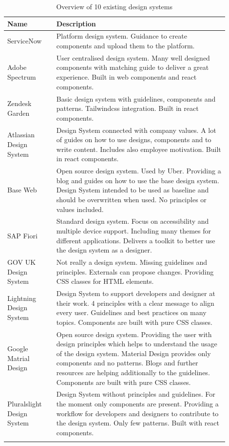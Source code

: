 \begin{longtable}{|p{0.2\linewidth} | p{0.7\linewidth}|}
\hline
 \textbf{Name} & \textbf{Description} \\ \hline
ServiceNow \cite{servicenow_servicenow_nodate}  & Platform design system.  Guidance to create components and upload them to the platform. \\ \hline
Adobe Spectrum  \cite{spectrum_adobe_spectrum_nodate} & User centralised design system. Many well designed components with matching guide to deliver a great experience. Built in web components and react components. \\ \hline
Zendesk Garden \cite{zendesk_garden_zendesk_nodate} & Basic design system with guidelines, components and patterns. Tailwindcss integration. Built in react components. \\ \hline

Atlassian Design System \cite{atlassian_design_system_atlassian_nodate} & Design System connected with company values. A lot of guides on how to use designs, components and to write content. Includes also employee motivation. Built in react components. \\ \hline
Base Web  \cite{base_base_nodate} & Open source design system. Used by Uber. Providing a blog and guides on how to use the base design system. Design System intended to be used as baseline and should be overwritten when used. No principles or values included. \\ \hline
SAP Fiori  \cite{sap_fiori_nodate} & Standard design system. Focus on accessibility and multiple device support. Including many themes for different applications. Delivers a toolkit to better use the design system as a designer.  \\ \hline
GOV UK Design System  \cite{govuk_govuk_nodate} & Not really a design system. Missing guidelines and principles. Externals can propose changes. Providing CSS classes for HTML elements.  \\ \hline
Lightning Design System \cite{lightning_design_system_lightning_nodate} & Design System to support developers and designer at their work. 4 principles with a clear message to align every user. Guidelines and best practices on many topics.  Components are built with pure CSS classes. \\ \hline
Google Matrial Design \cite{google_material_2022} & Open source design system. Providing the user with design principles which helps to understand the usage of the design system. Material Design provides only components and no patterns. Blogs and further resources are helping additionally to the guidelines. Components are built with pure CSS classes. \\ \hline
Pluralslight Design System \cite{pluralsight_ds_nodate} & Design System without principles and guidelines. For the moment only components are present. Providing a workflow for developers and designers to contribute to the design system.  Only few patterns. Built with react components.  \\ \hline
\caption{\label{tab:design_systems_in_the_wild} Overview of 10 existing design systems}
\end{longtable}
